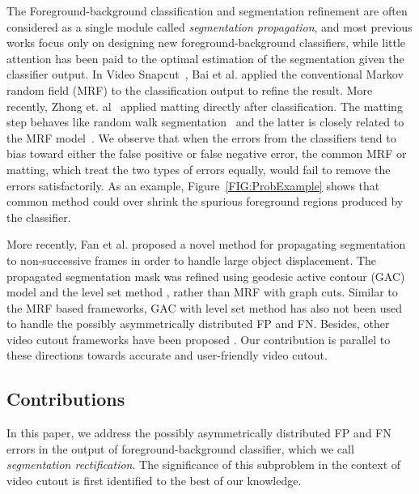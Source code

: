 \documentclass[10pt,journal,compsoc]{newIEEEtran}
\begin{document}
The Foreground-background classification and segmentation refinement are often considered as a single module called \emph{segmentation propagation}, and most previous works focus only on designing new foreground-background classifiers, while little attention has been paid to the optimal estimation of the segmentation given the classifier output. In Video Snapcut~\cite{Bai09VideoSnapCut_SIGGRAPH}, Bai et al. applied the conventional Markov random field (MRF) to the classification output to refine the result. More recently, Zhong et. al~\cite{Zhong2012UDC_SIGGRAPHAsia} applied matting directly after classification. The matting step behaves like random walk segmentation~\cite{grady2006random} and the latter is closely related to the MRF model~\cite{Sinop2007seeded}. We observe that when the errors from the classifiers tend to bias toward either the false positive or false negative error, the common MRF or matting, which treat the two types of errors equally, would fail to remove the errors satisfactorily. As an example, Figure~\ref{FIG:ProbExample} shows that common method could over shrink the spurious foreground regions produced by the classifier.

More recently, Fan et al.\cite{Fan2015JumpCut} proposed a novel method for propagating segmentation to non-successive frames in order to handle large object displacement. The propagated segmentation mask was refined using geodesic active contour (GAC) model \cite{Caselles97GAC} and the level set method \cite{OsherSethian88Fronts}, rather than MRF with graph cuts. Similar to the MRF based frameworks, GAC with level set method has also not been used to handle the possibly asymmetrically distributed FP and FN. Besides, other video cutout frameworks have been proposed \cite{Tong2011video,FuHongbo2012EXCOL,zhang2015efficient}. Our contribution is parallel to these directions towards accurate and user-friendly video cutout.

\subsection{Contributions}
In this paper, we address the possibly asymmetrically distributed FP and FN errors in the output of foreground-background classifier, which we call {\em segmentation rectification}. The significance of this subproblem in the context of video cutout is first identified to the best of our knowledge.
\end{document}
